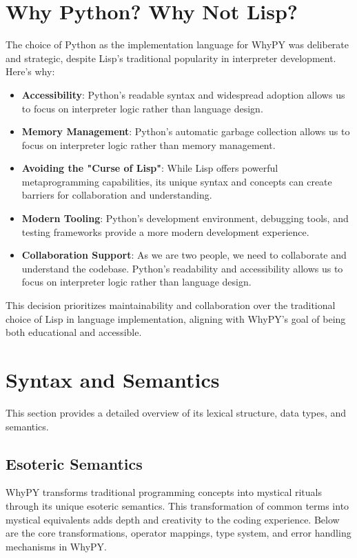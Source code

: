 \documentclass[conference]{IEEEtran}
\begin{document}
\section{Why Python? Why Not Lisp?}
The choice of Python as the implementation language for WhyPY was deliberate and strategic, despite Lisp's traditional popularity in interpreter development. Here's why:

\begin{itemize}
    \item \textbf{Accessibility}: Python's readable syntax and widespread adoption allows us to focus on interpreter logic rather than language design.
    
    \item \textbf{Memory Management}: Python's automatic garbage collection allows us to focus on interpreter logic rather than memory management.
    
    \item \textbf{Avoiding the "Curse of Lisp"}: While Lisp offers powerful metaprogramming capabilities, its unique syntax and concepts can create barriers for collaboration and understanding.
    
    \item \textbf{Modern Tooling}: Python's development environment, debugging tools, and testing frameworks provide a more modern development experience.
    
    \item \textbf{Collaboration Support}: As we are two people, we need to collaborate and understand the codebase. Python's readability and accessibility allows us to focus on interpreter logic rather than language design.
\end{itemize}

This decision prioritizes maintainability and collaboration over the traditional choice of Lisp in language implementation, aligning with WhyPY's goal of being both educational and accessible.


\section{Syntax and Semantics}
This section provides a detailed overview of its lexical structure, data types, and semantics.




\subsection{Esoteric Semantics}
WhyPY transforms traditional programming concepts into mystical rituals through its unique esoteric semantics. This transformation of common terms into mystical equivalents adds depth and creativity to the coding experience. Below are the core transformations, operator mappings, type system, and error handling mechanisms in WhyPY.
\end{document}
